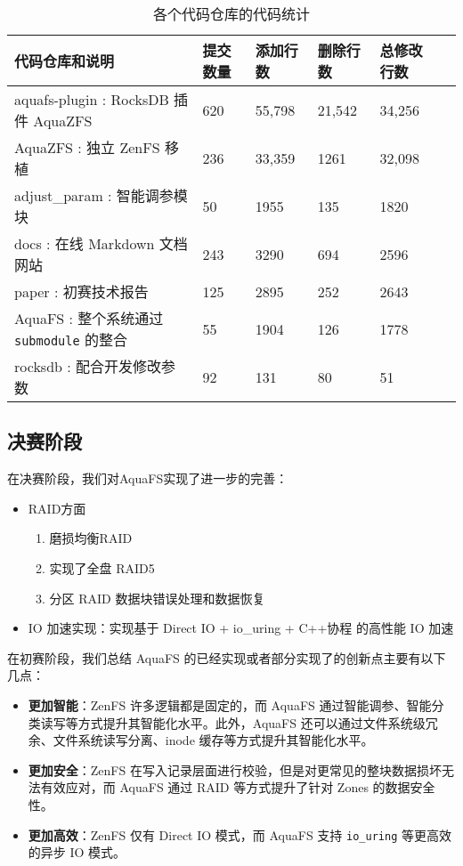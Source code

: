 \begin{table}[H]
  \centering
  \caption{各个代码仓库的代码统计}
  \label{tab:code-repo}
  \begin{tabular}{llllll}
  \hline
  \textbf{代码仓库和说明} & \textbf{提交数量} & \textbf{添加行数} & \textbf{删除行数} & \textbf{总修改行数} \\
  \hline
  aquafs-plugin  : RocksDB 插件 AquaZFS & 620 & 55,798 & 21,542 & 34,256 \\ 
  AquaZFS        : 独立 ZenFS 移植 & 236 & 33,359 & 1261 & 32,098 \\ 
  adjust\_param  : 智能调参模块 & 50 & 1955 & 135 & 1820 \\ 
  docs           : 在线 Markdown 文档网站 & 243 & 3290 & 694 & 2596 \\ 
  paper          : 初赛技术报告 & 125 & 2895 & 252 & 2643 \\ 
  AquaFS         : 整个系统通过 \verb|submodule| 的整合 & 55 & 1904 & 126 & 1778 \\ 
  rocksdb        : 配合开发修改参数 & 92 & 131 & 80 & 51 \\ 
  \end{tabular}
\end{table}

\subsection{决赛阶段}

在决赛阶段，我们对AquaFS实现了进一步的完善：

\begin{itemize}
  \item RAID方面
  \begin{enumerate}
    \item 磨损均衡RAID
    \item 实现了全盘 RAID5
    \item 分区 RAID 数据块错误处理和数据恢复
  \end{enumerate}
  \item IO 加速实现：实现基于 Direct IO + io\_uring + C++协程 的高性能 IO 加速
\end{itemize}

在初赛阶段，我们总结 AquaFS 的已经实现或者部分实现了的创新点主要有以下几点：

\begin{itemize}
  \item \textbf{更加智能}：ZenFS 许多逻辑都是固定的，而 AquaFS 通过智能调参、智能分类读写等方式提升其智能化水平。此外，AquaFS 还可以通过文件系统级冗余、文件系统读写分离、inode 缓存等方式提升其智能化水平。
  \item \textbf{更加安全}：ZenFS 在写入记录层面进行校验，但是对更常见的整块数据损坏无法有效应对，而 AquaFS 通过 RAID 等方式提升了针对 Zones 的数据安全性。
  \item \textbf{更加高效}：ZenFS 仅有 Direct IO 模式，而 AquaFS 支持 \verb|io_uring| 等更高效的异步 IO 模式。
\end{itemize}

